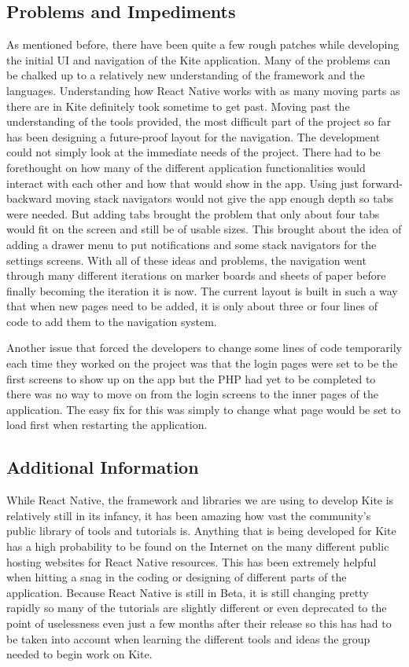 \documentclass[compsoc, 10, draftclsnofoot, onecolumn]{IEEEtran}
\begin{document}
\subsection{Problems and Impediments}

As mentioned before, there have been quite a few rough patches while developing the initial UI and navigation of the Kite application. Many of the problems can be chalked up to a relatively new understanding of the framework and the languages. Understanding how React Native works with as many moving parts as there are in Kite definitely took sometime to get past. Moving past the understanding of the tools provided, the most difficult part of the project so far has been designing a future-proof layout for the navigation. The development could not simply look at the immediate needs of the project. There had to be forethought on how many of the different application functionalities would interact with each other and how that would show in the app. Using just forward-backward moving stack navigators would not give the app enough depth so tabs were needed. But adding tabs brought the problem that only about four tabs would fit on the screen and still be of usable sizes. This brought about the idea of adding a drawer menu to put notifications and some stack navigators for the settings screens. With all of these ideas and problems, the navigation went through many different iterations on marker boards and sheets of paper before finally becoming the iteration it is now. The current layout is built in such a way that when new pages need to be added, it is only about three or four lines of code to add them to the navigation system.

Another issue that forced the developers to change some lines of code temporarily each time they worked on the project was that the login pages were set to be the first screens to show up on the app but the PHP had yet to be completed to there was no way to move on from the login screens to the inner pages of the application. The easy fix for this was simply to change what page would be set to load first when restarting the application. 

\subsection{Additional Information}

While React Native, the framework and libraries we are using to develop Kite is relatively still in its infancy, it has been amazing how vast the community's public library of tools and tutorials is. Anything that is being developed for Kite has a high probability to be found on the Internet on the many different public hosting websites for React Native resources. This has been extremely helpful when hitting a snag in the coding or designing of different parts of the application. Because React Native is still in Beta, it is still changing pretty rapidly so many of the tutorials are slightly different or even deprecated to the point of uselessness even just a few months after their release so this has had to be taken into account when learning the different tools and ideas the group needed to begin work on Kite.
\end{document}
